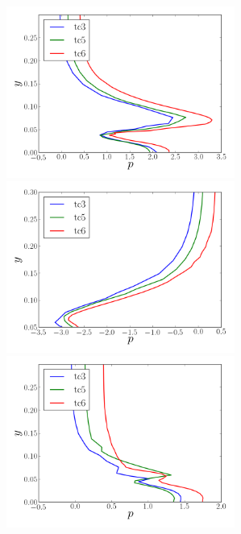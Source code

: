 \documentclass[12pt,oneside,a4paper]{article}
\begin{document}
\begin{figure}
\centering
\includegraphics[width=7.5cm]{images/CFD_meshIndependence/X1_p.png}\hfill \includegraphics[width=7.5cm]{images/CFD_meshIndependence/X2_p.png}\\
\includegraphics[width=7.5cm]{images/CFD_meshIndependence/X3_p.png}
\end{figure}
\end{document}
